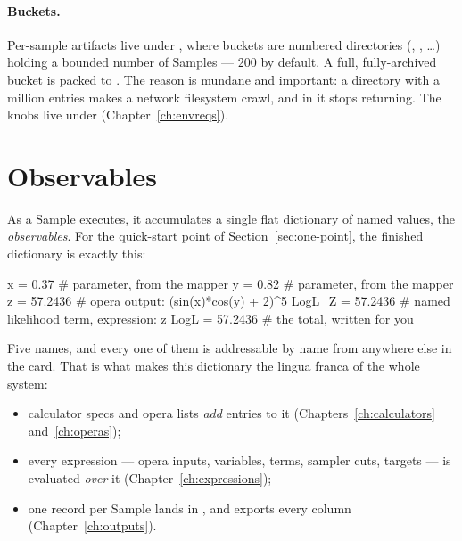 \paragraph{Buckets.} Per-sample artifacts live under
, where buckets are numbered directories
(, , \ldots) holding a bounded number of Samples --- 200 by
default. A full, fully-archived bucket is packed to . The reason is
mundane and important: a directory with a million entries makes a network filesystem
crawl, and  in it stops returning. The knobs live under
 (Chapter~\ref{ch:envreqs}).

\section{Observables}
\label{sec:observables}

As a Sample executes, it accumulates a single flat dictionary of named values, the
\emph{observables}. For the quick-start point of Section~\ref{sec:one-point}, the finished
dictionary is exactly this:

\begin{terminal}
\begin{jout}
x        = 0.37        # parameter, from the mapper
y        = 0.82        # parameter, from the mapper
z        = 57.2436     # opera output: (sin(x)*cos(y) + 2)^5
LogL_Z   = 57.2436     # named likelihood term, expression: z
LogL     = 57.2436     # the total, written for you
\end{jout}
\end{terminal}

Five names, and every one of them is addressable by name from anywhere else in the card.
That is what makes this dictionary the lingua franca of the whole system:

\begin{itemize}
  \item calculator  specs and opera  lists \emph{add}
        entries to it (Chapters~\ref{ch:calculators} and~\ref{ch:operas});
  \item every expression --- opera inputs,  variables,
         terms, sampler  cuts,
         targets --- is evaluated \emph{over} it
        (Chapter~\ref{ch:expressions});
  \item one record per Sample lands in , and
         exports every column (Chapter~\ref{ch:outputs}).
\end{itemize}

